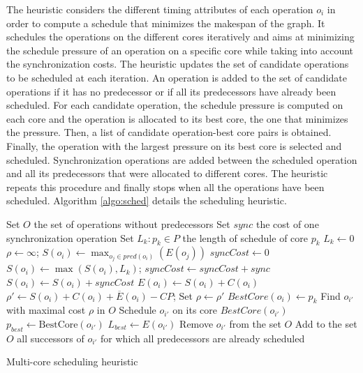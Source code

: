 The heuristic considers the different timing attributes of each operation $o_i$ in order to compute a schedule that minimizes the makespan of the graph. It schedules the operations on the different cores iteratively and aims at minimizing the schedule pressure of an operation on a specific core while taking into account the synchronization costs. %
The heuristic updates the set of candidate operations to be scheduled at each iteration. An operation is added to the set of candidate operations if it has no predecessor or if all its predecessors have already been scheduled. For each candidate operation, the schedule pressure is computed on each core and the operation is allocated to its best core, the one that minimizes the pressure. Then, a list of candidate operation-best core pairs is obtained. Finally, the operation with the largest pressure on its best core is selected and scheduled. Synchronization operations are added between the scheduled operation and all its predecessors that were allocated to different cores. The heuristic repeats this procedure and finally stops when all the operations have been scheduled. Algorithm \ref{algo:sched} details the scheduling heuristic. 

\begin{algorithm}[!htp]		
 		Set $O$ the set of operations without predecessors\;
		Set $sync$ the cost of one synchronization operation\;
		Set $L_k: p_k \in P$ the length of schedule of core $p_k$\;
		{
			$L_k \leftarrow 0$\;
		}
		{
			{
 				$\rho \leftarrow \infty$; 
				$S(o_i) \leftarrow \max_{o_j \in pred(o_i)}(E(o_j))$\;
				{
					$syncCost \leftarrow 0$\;
					$S(o_i) \leftarrow \max(S(o_i) , L_k)$; 
					{
						{
							$syncCost \leftarrow syncCost + sync$\; 
						}
					}
					$S(o_i) \leftarrow S(o_i) + syncCost$\;
					$E(o_i) \leftarrow S(o_i) + C(o_i)$\;
  				$\rho' \leftarrow S(o_i) + C(o_i) + \overline{E}(o_i) - CP$; 
					{
  					Set $\rho \leftarrow \rho'$\;
  					$BestCore(o_i) \leftarrow p_k$\;
  				}
  			}
  		 }
  		 Find $o_{i'}$ with maximal cost $\rho$ in $O$\; 
  		 Schedule $o_{i'}$ on its core $BestCore(o_{i'})$\;
  		 $p_{best} \leftarrow \mathrm{BestCore}(o_{i'})$\;
  		 $L_{best} \leftarrow E(o_{i'})$\;
  		 Remove $o_{i'}$ from the set $O$\;
  		 Add to the set $O$ all successors of $o_{i'}$ for which all predecessors are already scheduled\;
		}
	\caption{Multi-core scheduling heuristic}
	\label{algo:sched}
\end{algorithm}

